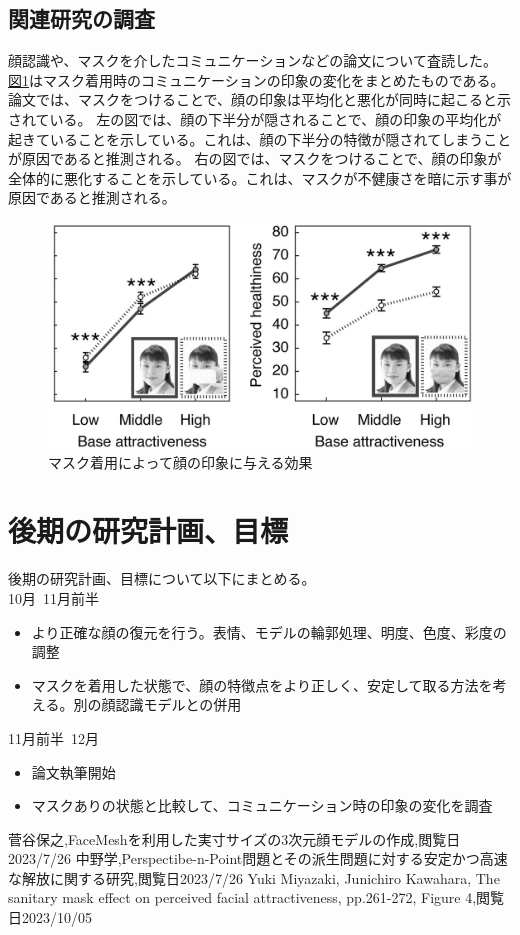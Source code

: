 \documentclass[]{jarticle}          %
\begin{document}
\subsection{関連研究の調査}
顔認識や、マスクを介したコミュニケーションなどの論文について査読した。\\
\hyperref[six]{図\ref{six}}はマスク着用時のコミュニケーションの印象の変化をまとめたものである。
論文\cite{bib_3}では、マスクをつけることで、顔の印象は平均化と悪化が同時に起こると示されている。
左の図では、顔の下半分が隠されることで、顔の印象の平均化が起きていることを示している。これは、顔の下半分の特徴が隠されてしまうことが原因であると推測される。
右の図では、マスクをつけることで、顔の印象が全体的に悪化することを示している。これは、マスクが不健康さを暗に示す事が原因であると推測される。
\begin{figure}[!ht]
  \begin{center}
     \includegraphics[scale=0.3]{figures/maskeffect.jpg}
     \caption{マスク着用によって顔の印象に与える効果}
     \label{six}
   \end{center}
 \end{figure}
\newpage
\section{後期の研究計画、目標}
後期の研究計画、目標について以下にまとめる。\\
10月~11月前半
\begin{itemize}
  \item より正確な顔の復元を行う。表情、モデルの輪郭処理、明度、色度、彩度の調整
  \item マスクを着用した状態で、顔の特徴点をより正しく、安定して取る方法を考える。別の顔認識モデルとの併用
\end{itemize}
11月前半~12月
\begin{itemize}
  \item 論文執筆開始
  \item マスクありの状態と比較して、コミュニケーション時の印象の変化を調査
\end{itemize}
\begin{thebibliography}{99}
 菅谷保之,FaceMeshを利用した実寸サイズの3次元顔モデルの作成,閲覧日2023/7/26
 中野学,Perspectibe-n-Point問題とその派生問題に対する安定かつ高速な解放に関する研究,閲覧日2023/7/26
 Yuki Miyazaki, Junichiro Kawahara, The sanitary mask effect on perceived facial attractiveness, pp.261-272, Figure 4,閲覧日2023/10/05
\end{thebibliography}
\end{document}
